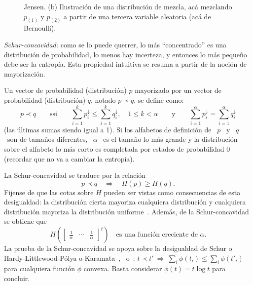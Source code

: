 \begin{propiedades}
\begin{figure}[h!]
{    Jensen.  (b) Ilustraci\'on de  una distribuci\'on de mezcla, ac\'a mezclando
    $p_{(1)}$ y $p_{(2)}$  a partir de una tercera  variable aleatoria (ac\'a de
    Bernoulli).}
  \label{Fig:SZ:Concavidad}
  \end{figure}
%
\setcounter{PropSchurConcavidad}{\value{enumi}}
\item\label{Prop:SZ:Schurconcavidad}  {\it Schur-concavidad:}  como se  lo puede
  querrer, lo  m\'as ``concentrado'' es  una distribuci\'on de  probabilidad, lo
  menos   hay  incerteza,   y  entonces   lo   m\'as  peque\~no   debe  ser   la
  entrop\'ia.  Esta propiedad intuitiva  se resuma  a partir  de la  noci\'on de
  mayorizaci\'on.
  \begin{definicion}[Mayorizaci\'on]\label{Def:SZ:Mayorizacion}
    Un vector de  probabilidad (distribuci\'on) $p$ mayorizado por  un vector de
    probabilidad (distribuci\'on) $q$, notado $p \prec q$, se define como:
    \[
    p  \prec   q  \qquad  \mbox{ssi}  \qquad   \sum_{i=1}^k  p_i^\downarrow  \le
    \sum_{i=1}^k q_i^\downarrow, \quad  1 \le k < \alpha  \qquad \mbox{y} \qquad
    \sum_{i=1}^\alpha p_i^\downarrow = \sum_{i=1}^\alpha q_i^\downarrow
    \]
    (las \'ultimas sumas siendo igual a 1).  Si los alfabetos de definici\'on de
    \ $p$ \ y  \ $q$ \ son de tama\~nos diferentes, \  $\alpha$ \ es el tama\~no
    lo m\'as  grande y  la distribuci\'on  sobre el alfabeto  lo m\'as  corto es
    completada por  estados de probabilidad 0  (recordar que no va  a cambiar la
    entrop\'ia).
  \end{definicion}
  La  Schur-concavidad  se  traduce  por  la  relaci\'on
  \[
  p \prec  q \quad \Rightarrow  \quad H(p) \ge  H(q).
  \]
  Fijense de  que las cotas  sobre $H$ pueden  ser vistas como  consecuencias de
  esta desigualdad: la  distribuci\'on cierta mayoriza cualquiera distribuci\'on
  y  cualquiera distribuci\'on  mayoriza la  distribuci\'on uniforme~\cite[p.~9,
  (6)-(8)]{MarOlk11}.  Adem\'as, de la Schur-concavidad se obtiene que
  \[
  H\left( \begin{bmatrix}  \frac1\alpha & \cdots  & \frac1\alpha \end{bmatrix}^t
  \right) \quad \mbox{es una funci\'on creciente de } \alpha.
  \]
  La prueba  de la  Schur-concavidad se  apoya sobre la  desigualdad de  Schur o
  Hardy-Littlewood-P\'olya    o     Karamata~\cite{Sch23,    HarLit29,    Kar32,
    HarLit52},~\cite[Cap.~3,                                 Prop.~C.1]{MarOlk11}
  o~\cite[Teorema~II.3.1]{Bha97}: $t \prec t' \: \Rightarrow \: \sum_i \phi(t_i)
  \le  \sum_i  \phi(t'_i)$  para  cualquiera  funci\'on  $\phi$  convexa.  Basta
  considerar $\phi(t) = t \log t$ para concluir.
\end{propiedades}
%


